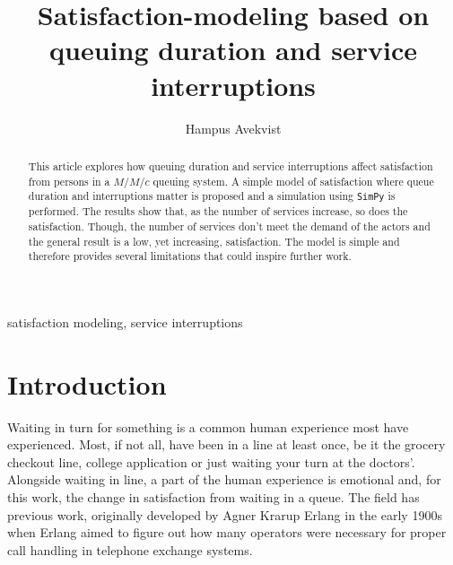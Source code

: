\documentclass[conference]{IEEEtran}
\begin{document}
\title{Satisfaction-modeling based on queuing duration and service interruptions}

\author{
    Hampus Avekvist \\
}

\maketitle

\begin{abstract}
    This article explores how queuing duration and service
    interruptions affect satisfaction from persons in a $M/M/c$
    queuing system. A simple model of satisfaction where queue
    duration and interruptions matter is proposed and a simulation
    using \verb|SimPy| is performed. The results show that, as the
    number of services increase, so does the satisfaction. Though,
    the number of services don't meet the demand of the actors and
    the general result is a low, yet increasing, satisfaction. The
    model is simple and therefore provides several limitations
    that could inspire further work.
\end{abstract}

\begin{IEEEkeywords}
    satisfaction modeling, service interruptions
\end{IEEEkeywords}

\section{Introduction}

Waiting in turn for something is a common human experience most
have experienced. Most, if not all, have been in a line at least
once, be it the grocery checkout line, college application or
just waiting your turn at the doctors'. Alongside waiting in line,
a part of the human experience is emotional and, for this work,
the change in satisfaction from waiting in a queue. The field
has previous work, originally developed by Agner Krarup Erlang
\cite{ErlangSandsynlighedsregning, NeuroLaunchMakingSomeoneWait}
in the early 1900s when Erlang aimed to figure out how many
operators were necessary for proper call handling in telephone
exchange systems.
\end{document}
